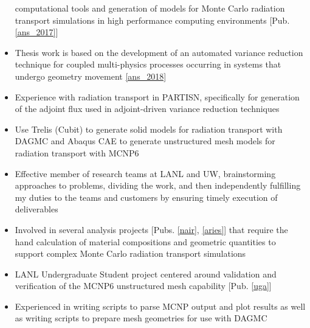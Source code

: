\begin{center}
\begin{minipage}{\textwidth}
\begin{itemize}[leftmargin=.875in,rightmargin=.875in,itemsep=1.0mm]
		       computational tools
		       and generation of models for Monte Carlo radiation transport
		       simulations
		       in high performance computing environments [Pub. \ref{ans_2017}]
	       \item Thesis work is based on the development of an automated variance reduction technique for
		       coupled multi-physics processes occurring in 
		       systems that undergo geometry movement \ref{ans_2018}
              \item Experience with radiation transport in PARTISN, specifically for                    generation of the adjoint flux used in adjoint-driven variance reduction techniques
              \item Use Trelis (Cubit) to generate solid models for radiation transport with DAGMC and Abaqus CAE to generate unstructured mesh models for radiation transport with MCNP6
		\item Effective member of research teams at LANL and
			UW, brainstorming approaches to problems, dividing the
			work, and then independently fulfilling my duties to the teams and
			customers by ensuring timely execution of deliverables
	       \item Involved in several analysis projects
		      [Pubs. \ref{nair}, \ref{aries}]	       
			       that require the hand calculation of material compositions
			     and geometric quantities to support complex Monte
			      Carlo radiation transport simulations
	       \item  LANL Undergraduate Student project centered around validation and
		       verification of the MCNP6 unstructured mesh
		       capability [Pub. \ref{uga}]
	       \item Experienced in writing scripts to parse MCNP output
	               and plot results as well as writing scripts to
		       prepare mesh geometries for use with DAGMC

\end{itemize}
\end{minipage}
\end{center}
